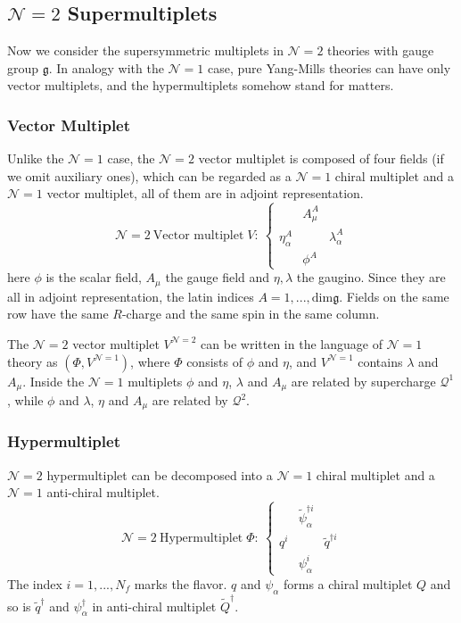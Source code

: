 \documentclass{article}
\begin{document}
\subsection{$\mathcal{N}=2$ Supermultiplets}
Now we consider the supersymmetric multiplets in $\mathcal{N}=2$ theories with gauge group $\mathfrak{g}$. In analogy with the $\mathcal{N}=1$ case, pure Yang-Mills theories can have only vector multiplets, and the hypermultiplets somehow stand for matters.

\subsubsection{Vector Multiplet}
Unlike the $\mathcal{N}=1$ case, the $\mathcal{N}=2$ vector multiplet is composed of four fields (if we omit auxiliary ones), which can be regarded as a $\mathcal{N}=1$ chiral multiplet and a $\mathcal{N}=1$ vector multiplet, all of them are in adjoint representation.
\begin{equation}
\mathcal{N}=2\ \text{Vector multiplet}\;V :\ \left\{
\begin{matrix}
 &A^{A}_{\mu}& \\
\eta_{\alpha}^A& &\lambda_{\alpha}^A
\\&\phi^A& 
\end{matrix}
\right.
\end{equation}
here $\phi$ is the scalar field, $A_\mu$ the gauge field and $\eta,\lambda$ the gaugino. Since they are all in adjoint representation, the latin indices $A=1,...,\mathrm{dim}\mathfrak{g}$. Fields on the same row have the same $R$-charge and the same spin in the same column.

The $\mathcal{N}=2$ vector multiplet $V^{\mathcal{N}=2}$ can be written in the language of $\mathcal{N}=1$ theory as $(\Phi, V^{\mathcal{N}=1})$, where $\Phi$ consists of $\phi$ and $\eta$, and $ V^{\mathcal{N}=1}$ contains $\lambda$ and $A_\mu$. Inside the $\mathcal{N}=1$ multiplets $\phi$ and $\eta$, $\lambda$ and $A_\mu$ are related by supercharge $\mathcal{Q}^1$, while $\phi$ and $\lambda$, $\eta$ and $A_\mu$ are related by $\mathcal{Q}^2$. 

\subsubsection{Hypermultiplet}
$\mathcal{N}=2$ hypermultiplet can be decomposed into a $\mathcal{N}=1$ chiral multiplet and a $\mathcal{N}=1$ anti-chiral multiplet.
\begin{equation}
\mathcal{N}=2\ \text{Hypermultiplet}\;\Phi:\ \left\{
\begin{matrix}
 &\tilde{\psi}^{\dagger i}_{\alpha}& \\
q^i& &\tilde{q}^{\dagger i}
\\&\psi_{\alpha}^i& 
\end{matrix}
\right.
\end{equation}
The index $i=1,...,N_f$ marks the flavor. $q$ and $\psi_\alpha$ forms a chiral multiplet $Q$ and so is $\tilde{q}^{\dagger}$ and $\psi^{\dagger}_\alpha$ in anti-chiral multiplet $\tilde{Q}^{\dagger}$. 
\end{document}

